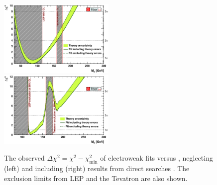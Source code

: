 \begin{figure}
	\includegraphics[width=0.495\textwidth]{tex/motivation/ewfit_nodirect}
	\hfill
	\includegraphics[width=0.495\textwidth]{tex/motivation/ewfit_withdirect}
	\caption{The observed $\Delta\chi^2 = \chi^2 - \chi^2_{\min}$ of electroweak fits 
	versus \mH, neglecting (left) and including (right) results from direct searches
	\cite{Gfitter:2008}. The exclusion limits from LEP and the Tevatron are also shown.}
	\label{fig:ewfit}
\end{figure}

